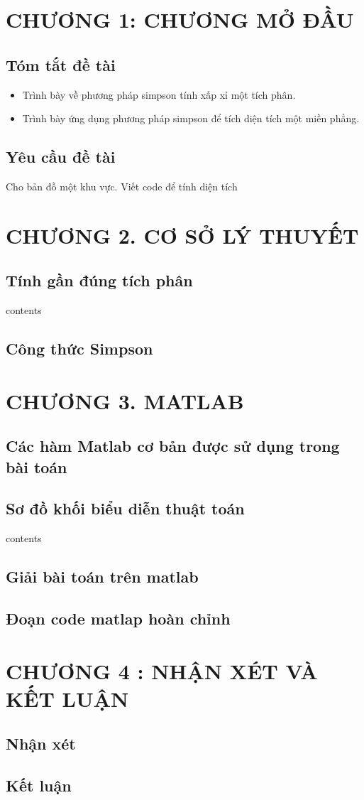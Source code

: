 \documentclass[14pt,a4paper]{article}
\begin{document}
\section*{CHƯƠNG 1: CHƯƠNG MỞ ĐẦU}
\setcounter{section}{1}
\subsection{Tóm tắt đề tài}
\begin{itemize}
\item \fontsize{13pt}{2pt}\selectfont Trình bày về phương pháp simpson tính xấp xỉ một tích phân. \\
\item \fontsize{13pt}{2pt}\selectfont Trình bày ứng dụng phương pháp simpson để tích diện tích một miền phẳng.
\end{itemize}
\subsection{Yêu cầu đề tài}
\fontsize{13pt}{2pt}\selectfont Cho bản đồ một khu vực. Viết code để tính diện tích
\newpage
\section*{CHƯƠNG 2. CƠ SỞ LÝ THUYẾT}
\subsection{Tính gần đúng tích phân}
contents
\subsection{ Công thức Simpson}
\newpage
\section*{CHƯƠNG 3. MATLAB}
\subsection{ Các hàm Matlab cơ bản được sử dụng trong bài toán}
\subsection{Sơ đồ khối biểu diễn thuật toán}
contents
\subsection{Giải bài toán trên matlab}
\subsection{Đoạn code matlap hoàn chỉnh}
\newpage
\section*{CHƯƠNG 4 : NHẬN XÉT VÀ KẾT LUẬN}
\subsection{  Nhận xét}
\subsection{Kết luận}
\newpage
\end{document}
